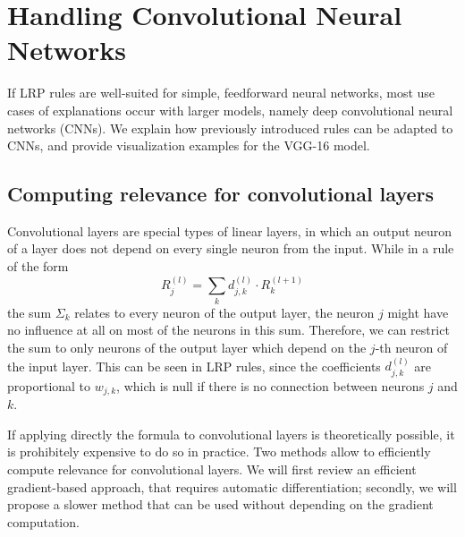 \documentclass{../cs-classes/cs-classes}
\newcommand*{\1}{\digitsbb{1}}
\newcommand*{\0}{\digitsbb{0}}
\begin{document}
\section{Handling Convolutional Neural Networks}
If LRP rules are well-suited for simple, feedforward neural networks, most use cases of explanations occur with larger models, namely deep convolutional neural networks (CNNs). We explain how previously introduced rules can be adapted to CNNs, and provide visualization examples for the VGG-16 model.

\subsection{Computing relevance for convolutional layers}
Convolutional layers are special types of linear layers, in which an output neuron of a layer does not depend on every single neuron from the input. While in a rule of the form
\begin{equation*}
    R_j^{(l)} = \sum_k d_{j, k}^{(l)} \cdot R_k^{(l+1)}
\end{equation*}
the sum $\Sigma_k$ relates to every neuron of the output layer, the neuron $j$ might have no influence at all on most of the neurons in this sum. Therefore, we can restrict the sum to only neurons of the output layer which depend on the $j$-th neuron of the input layer. This can be seen in LRP rules, since the coefficients $d_{j, k}^{(l)}$ are proportional to $w_{j,k}$, which is null if there is no connection between neurons $j$ and $k$. 

If applying directly the formula to convolutional layers is theoretically possible, it is prohibitely expensive to do so in practice. Two methods allow to efficiently compute relevance for convolutional layers. We will first review an efficient gradient-based approach, that requires automatic differentiation; secondly, we will propose a slower method that can be used without depending on the gradient computation.
\end{document}
